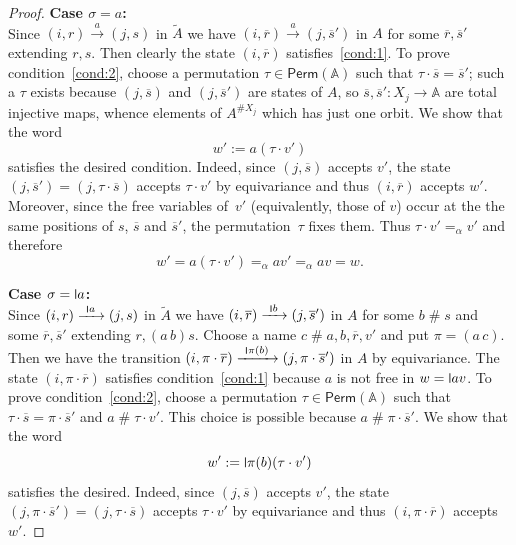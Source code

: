 \documentclass[final,a4paper,UKenglish,thm-restate,autoref,numberwithinsect]{lipics-v2021}
\newcommand{\midmid}{\hspace{0.2ex}{\rule[-0.1ex]{0.6pt}{1.65ex}}\hspace{0.2ex}}
\newcommand{\scriptmidmid}{\hspace{0.2ex}{\rule[-0.1ex]{0.6pt}{1.1ex}}\hspace{0.2ex}}
\newcommand{\newletter}[1]{{\midmid}#1}
\newcommand{\scriptnew}[1]{{\scriptmidmid}#1}
\numberwithin{equation}{section}
\newcommand{\ol}{\overline}
\newcommand{\xto}[1]{\xrightarrow{~#1~}}
\newcommand{\tl}{\widetilde}
\newcommand{\Perm}{\mathsf{Perm}}
\newcommand{\+}[1]{\mathcal{#1}\xspace}
\newcommand{\names}{\mathbb{A}}
\newcommand{\fresh}{\mathbin{\#}}
\theoremstyle{definition}
\begin{document}
\begin{proof}
  \smallskip\noindent\textbf{Case $\sigma=a$:} \\
  Since $(i,r)\xto{a} (j,s)$ in $\tl{A}$ we have
  $(i,\ol{r})\xto{a}(j,\ol{s}')$
  in $A$ for some
  $\ol{r}, \ol{s}'$ extending $r,s$. Then clearly the state
  $(i,\ol{r})$ satisfies~\ref{cond:1}. To prove condition~\ref{cond:2}, choose a
  permutation $\tau\in \Perm(\names)$ such that
  $\tau\cdot \ol{s}=\ol{s}'$; such a $\tau$ exists because
  $(j,\ol{s})$ and $(j,\ol{s}')$ are states of $A$, so
  $\ol{s},\ol{s}'\colon X_j\to \names$ are total injective maps,
  whence elements of $A^{\# X_j}$ which has just one orbit.
  We show that the word
  \[
    w':=a(\tau\cdot v')
  \]
  satisfies the desired condition. Indeed, since $(j,\ol{s})$ accepts
  $v'$, the state $(j,\ol{s}')=(j,\tau\cdot\ol{s})$ accepts
  $\tau\cdot v'$ by equivariance and thus $(i,\ol{r})$ accepts
  $w'$. Moreover, since the free variables of~$v'$ (equivalently,
  those of $v$) occur at the the same positions of $s$, $\ol{s}$ and
  $\ol{s}'$, the permutation~$\tau$ fixes them. Thus
  $\tau\cdot v' =_\alpha v'$ and therefore
  \[ w'=a(\tau\cdot v') =_\alpha av' =_\alpha av = w.\]

  \smallskip\noindent \textbf{Case $\sigma=\newletter a$:} \\
  Since $(i,r)\xto{\scriptnew a} (j,s)$ in $\tl{A}$ we have
  $(i,\ol{r})\xto{\scriptnew b}(j,\ol{s}')$ in $A$ for some
  $b\fresh s$ and some $\ol{r}, \ol{s}'$ extending $r,(a\,
  b)s$. Choose a name $c\fresh a,b,\ol{r},v'$ and put $\pi = (a\, c)$.
  Then we have the transition
  $(i,\pi\cdot \ol{r})\xto{\scriptnew \pi(b)} (j, \pi\cdot \ol{s}')$
  in ${A}$ by equivariance. The state $(i,\pi\cdot \ol{r})$ satisfies
  condition~\ref{cond:1} because $a$ is not free in $w=\newletter
  av$. To prove condition~\ref{cond:2}, choose a permutation
  $\tau\in \Perm(\names)$ such that
  $\tau\cdot \ol{s}=\pi \cdot \ol{s}'$ and $a\fresh \tau\cdot
  v'$. This choice is possible because $a\fresh \pi\cdot \ol{s}'$. We
  show that the word
  \[
    w':= \newletter \pi(b)(\tau\cdot v')
  \]
  satisfies the desired. Indeed, since $(j,\ol{s})$ accepts
  $v'$, the state $(j,\pi\cdot \ol{s}')=(j,\tau\cdot \ol{s})$
  accepts $\tau\cdot v'$ by equivariance and thus
  $(i,\pi\cdot \ol{r})$ accepts $w'$.


\end{proof}
\end{document}
